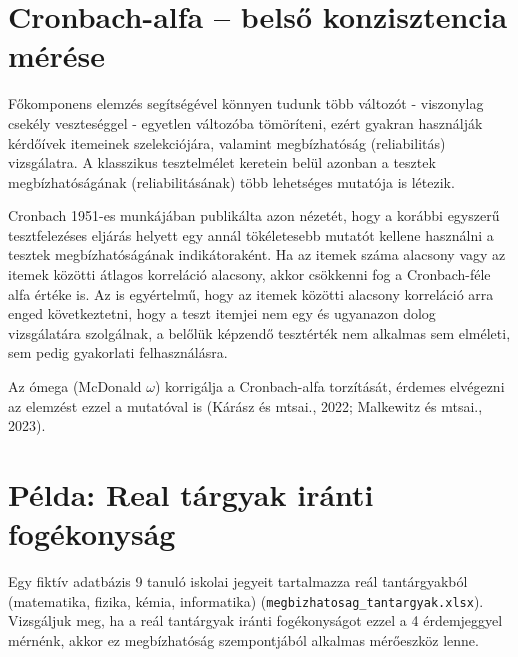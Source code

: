\documentclass[
  letterpaper,
]{krantz}
\makeatletter
\newenvironment{Shaded}{\begin{snugshade}}{\end{snugshade}}
\newcommand{\AttributeTok}[1]{\textcolor[rgb]{0.40,0.45,0.13}{#1}}
\newcommand{\CommentTok}[1]{\textcolor[rgb]{0.37,0.37,0.37}{#1}}
\newcommand{\FunctionTok}[1]{\textcolor[rgb]{0.28,0.35,0.67}{#1}}
\newcommand{\NormalTok}[1]{\textcolor[rgb]{0.00,0.23,0.31}{#1}}
\newcommand{\OtherTok}[1]{\textcolor[rgb]{0.00,0.23,0.31}{#1}}
\newcommand{\SpecialCharTok}[1]{\textcolor[rgb]{0.37,0.37,0.37}{#1}}
\newcommand{\StringTok}[1]{\textcolor[rgb]{0.13,0.47,0.30}{#1}}
\newenvironment{kframe}{%
\medskip{}
\setlength{\fboxsep}{.8em}
 \def\at@end@of@kframe{}%
 \ifinner\ifhmode%
  \def\at@end@of@kframe{\end{minipage}}%
  \begin{minipage}{\columnwidth}%
 \fi\fi%
 \def\FrameCommand##1{\hskip\@totalleftmargin \hskip-\fboxsep
 \colorbox{shadecolor}{##1}\hskip-\fboxsep
     \hskip-\linewidth \hskip-\@totalleftmargin \hskip\columnwidth}%
 \MakeFramed {\advance\hsize-\width
   \@totalleftmargin\z@ \linewidth\hsize
   \@setminipage}}%
 {\par\unskip\endMakeFramed%
 \at@end@of@kframe}
\renewenvironment{Shaded}{\begin{kframe}}{\end{kframe}}
\makeatother
\begin{document}
\hypertarget{cronbach-alfa-belsux151-konzisztencia-muxe9ruxe9se}{%
\section{Cronbach-alfa -- belső konzisztencia
mérése}\label{cronbach-alfa-belsux151-konzisztencia-muxe9ruxe9se}}

Főkomponens elemzés segítségével könnyen tudunk több változót -
viszonylag csekély veszteséggel - egyetlen változóba tömöríteni, ezért
gyakran használják kérdőívek itemeinek szelekciójára, valamint
megbízhatóság (reliabilitás) vizsgálatra. A klasszikus tesztelmélet
keretein belül azonban a tesztek megbízhatóságának (reliabilitásának)
több lehetséges mutatója is létezik.

Cronbach 1951-es munkájában publikálta azon nézetét, hogy a korábbi
egyszerű tesztfelezéses eljárás helyett egy annál tökéletesebb mutatót
kellene használni a tesztek megbízhatóságának indikátoraként. Ha az
itemek száma alacsony vagy az itemek közötti átlagos korreláció
alacsony, akkor csökkenni fog a Cronbach-féle alfa értéke is. Az is
egyértelmű, hogy az itemek közötti alacsony korreláció arra enged
következtetni, hogy a teszt itemjei nem egy és ugyanazon dolog
vizsgálatára szolgálnak, a belőlük képzendő tesztérték nem alkalmas sem
elméleti, sem pedig gyakorlati felhasználásra.

Az ómega (McDonald \(\omega\)) korrigálja a Cronbach-alfa torzítását,
érdemes elvégezni az elemzést ezzel a mutatóval is (Kárász és mtsai.,
2022; Malkewitz és mtsai., 2023).

\hypertarget{puxe9lda-real-tuxe1rgyak-iruxe1nti-foguxe9konysuxe1g}{%
\section{Példa: Real tárgyak iránti
fogékonyság}\label{puxe9lda-real-tuxe1rgyak-iruxe1nti-foguxe9konysuxe1g}}

Egy fiktív adatbázis 9 tanuló iskolai jegyeit tartalmazza reál
tantárgyakból (matematika, fizika, kémia, informatika)
(\texttt{megbizhatosag\_tantargyak.xlsx}). Vizsgáljuk meg, ha a reál
tantárgyak iránti fogékonyságot ezzel a 4 érdemjeggyel mérnénk, akkor ez
megbízhatóság szempontjából alkalmas mérőeszköz lenne.

\begin{Shaded}
\end{Shaded}
\end{document}
